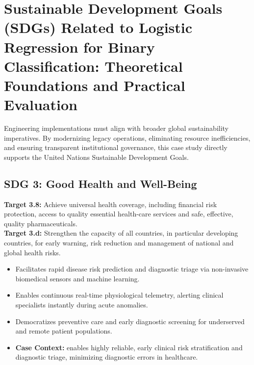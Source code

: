 \section{Sustainable Development Goals (SDGs) Related to Logistic Regression for Binary Classification: Theoretical Foundations and Practical Evaluation}
Engineering implementations must align with broader global sustainability imperatives. By modernizing legacy operations, eliminating resource inefficiencies, and ensuring transparent institutional governance, this case study directly supports the United Nations Sustainable Development Goals.

\subsection{SDG 3: Good Health and Well-Being}
\noindent\textbf{Target 3.8:} Achieve universal health coverage, including financial risk protection, access to quality essential health-care services and safe, effective, quality pharmaceuticals. \\
\noindent\textbf{Target 3.d:} Strengthen the capacity of all countries, in particular developing countries, for early warning, risk reduction and management of national and global health risks.
\begin{itemize}
  \item Facilitates rapid disease risk prediction and diagnostic triage via non-invasive biomedical sensors and machine learning.
  \item Enables continuous real-time physiological telemetry, alerting clinical specialists instantly during acute anomalies.
  \item Democratizes preventive care and early diagnostic screening for underserved and remote patient populations.
  \item \textbf{Case Context:} enables highly reliable, early clinical risk stratification and diagnostic triage, minimizing diagnostic errors in healthcare.
\end{itemize}

